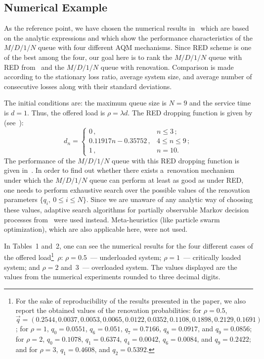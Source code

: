 \begin{multicols}{2}
\section{Numerical Example}

\noindent
As the reference point, we have chosen the numerical results in~\cite{Chyd}
which are based on the analytic expressions and which show the 
performance characteristics 
of the $M/D/1/N$ queue with four different AQM mechanisms. 
Since RED scheme is one of the best among the four,
our goal here is to rank the $M/D/1/N$ queue with RED from~\cite{Chyd}
and the $M/D/1/N$ queue with renovation. Comparison is made 
according to the stationary loss ratio, average system size,  
and average number of consecutive losses along with 
their standard deviations.

The initial conditions are: 
the maximum queue size is $N=9$ and the service time is $d=1$. 
Thus, the offered load is $\rho=\lambda d$. 
The RED dropping function is given by (see~\cite[Eq. (59)]{Chyd}):
\begin{equation}
\label{df}
d_n=
\begin{cases}
0\,, & n\le 3\,;\\
0.11917n - 0.35752\,, & 4 \le n \le 9\,;\\
1\,, & n=10.
\end{cases}
\end{equation}
The performance of the $M/D/1/N$ queue with this RED dropping function 
is given in~\cite[Tables 1, 3, and~4]{Chyd}.
In order to find out whether there exists a~renovation 
mechanism under which the $M/D/1/N$ queue can perform at least as good as
under RED, one needs to perform exhaustive search over
the possible values of the renovation parameters $\{q_i, \ 0 \le i \le N\}$.
Since we are unaware of any analytic way of choosing these values,
adaptive search algorithms for partially observable
Markov decision processes from~\cite{kono1} were used instead.
Meta-heuristics (like particle swarm optimization), which are also applicable here,
were not used.

In Tables~1 and~2, one can see the numerical results for the four different
cases of the offered load\footnote{For the sake of reproducibility 
of the results 
presented in the paper, we also report the obtained values of the renovation 
probabilities: for $\rho=0.5$,
${\vec q}=(0.2544,0.0037,0.0053,0.0065,0.0122,0.0352,0.1108,0.1898,0.2129,0.1691)$;
for $\rho=1$, $q_0=0.0551$, $q_6=0.051$, $q_7=0.7166$, $q_8=0.0917$, and
$q_9=0.0856$;
for $\rho=2$, $q_0=0.1078$, $q_1=0.6374$, $q_4=0.0042$, $q_6=0.0084$, and
$q_9=0.2422$; and
for $\rho=3$, $q_1=0.4608$, and $q_2=0.5392$.}~$\rho$: $\rho=0.5$~--- underloaded system;
$\rho=1$~--- critically loaded system;
and $\rho=2$ and~3~--- overloaded system. The values displayed are the 
values from the numerical experiments rounded to three decimal digits.


\end{multicols}
